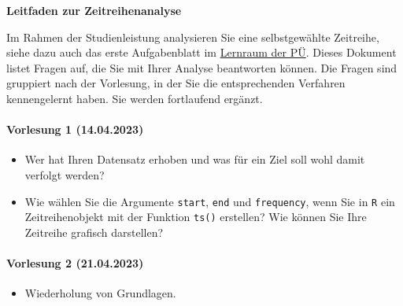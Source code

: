 \begin{center}
    \Large\sffamily
    \textbf{Leitfaden zur Zeitreihenanalyse}
\end{center}

Im Rahmen der Studienleistung analysieren Sie eine selbstgewählte Zeitreihe, siehe dazu auch das erste Aufgabenblatt im \href{https://moodle.uni-bielefeld.de/course/view.php?id=1035}{Lernraum der PÜ}. Dieses Dokument listet Fragen auf, die Sie mit Ihrer Analyse beantworten können. Die Fragen sind gruppiert nach der Vorlesung, in der Sie die entsprechenden Verfahren kennengelernt haben. Sie werden fortlaufend ergänzt.

\paragraph{Vorlesung 1 (14.04.2023)}
\begin{itemize}
    \item Wer hat Ihren Datensatz erhoben und was für ein Ziel soll wohl damit verfolgt werden?
    \item Wie wählen Sie die Argumente \texttt{start}, \texttt{end} und \texttt{frequency}, wenn Sie in \texttt{R} ein Zeitreihenobjekt mit der Funktion \texttt{ts()} erstellen? Wie können Sie Ihre Zeitreihe grafisch darstellen?
\end{itemize}

\paragraph{Vorlesung 2 (21.04.2023)}
\begin{itemize}
    \item Wiederholung von Grundlagen.
\end{itemize}